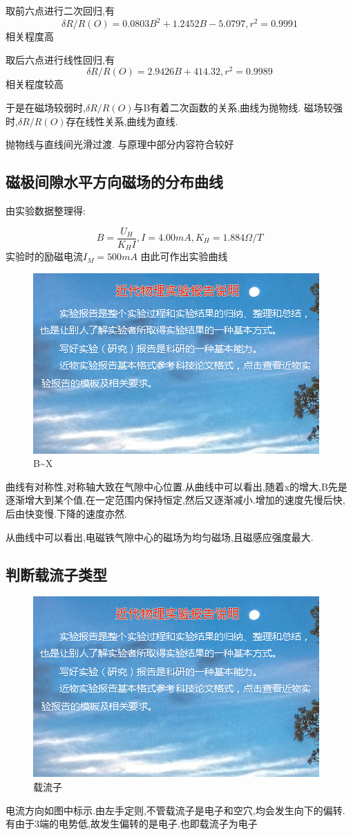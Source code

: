 \documentclass{thuemp}
\begin{document}
取前六点进行二次回归,有
\[\delta R/R(O)=0.0803B^{2}+1.2452B-5.0797,r^{2}=0.9991\]
相关程度高

取后六点进行线性回归,有
\[\delta R/R(O)=2.9426B+414.32,r^{2}=0.9989\]
相关程度较高

于是在磁场较弱时,$ \delta R/R(O) $与B有着二次函数的关系,曲线为抛物线.
磁场较强时,$ \delta R/R(O) $存在线性关系,曲线为直线.

抛物线与直线间光滑过渡.
与原理中部分内容符合较好
\subsection{磁极间隙水平方向磁场的分布曲线}
由实验数据整理得:

\[B=\frac{U_{H}}{K_{H}I},I=4.00mA,K_{H}=1.884 \Omega/T\]
	实验时的励磁电流$I_{M}=500mA$
由此可作出实验曲线
\begin{figure}[H]
	\centering
	\includegraphics[width=0.8\linewidth]{./image/example.jpg}
	\caption{B\~{}X} \label{fig:eg}
\end{figure}
曲线有对称性,对称轴大致在气隙中心位置.从曲线中可以看出,随着x的增大,B先是逐渐增大到某个值,在一定范围内保持恒定,然后又逐渐减小.增加的速度先慢后快,后由快变慢.下降的速度亦然.

从曲线中可以看出,电磁铁气隙中心的磁场为均匀磁场,且磁感应强度最大.
\subsection{判断载流子类型}
\begin{figure}[H]
	\centering
	\includegraphics[width=0.8\linewidth]{./image/example.jpg}
	\caption{载流子} \label{fig:eg}
\end{figure}
电流方向如图中标示.由左手定则,不管载流子是电子和空穴,均会发生向下的偏转.有由于3端的电势低,故发生偏转的是电子.也即载流子为电子
\end{document}

